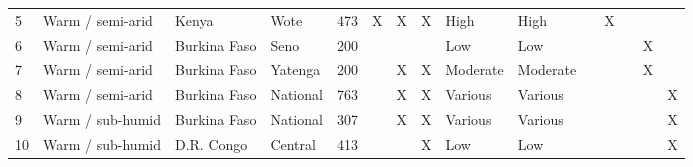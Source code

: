 \begin{sidewaystable}
\begin{tabular}{L{0.2cm} L{2.5cm} L{2cm} L{2cm} L{0.9cm} L{1cm} L{1cm} L{1cm} L{2cm} L{2cm} C{0.2cm} C{0.2cm} C{0.2cm} C{0.2cm} C{0.2cm}}
  5 & Warm / semi-arid & Kenya & Wote & 473 & X & X & X & High & High & & X & & & \\
  6 & Warm / semi-arid & Burkina Faso & Seno & 200 & &  & & Low & Low & & & & X & \\
  7 & Warm / semi-arid & Burkina Faso & Yatenga & 200 & & X & X & Moderate & Moderate & & & & X & \\
  8 & Warm / semi-arid & Burkina Faso & National & 763 & & X & X & Various & Various & & & & & X \\
  9 & Warm / sub-humid & Burkina Faso & National & 307 & & X & X & Various & Various & & & & & X \\
  10 & Warm / sub-humid & D.R. Congo & Central & 413 & & & X & Low & Low & & & & & X \\
  \bottomrule
  \end{tabular}

\end{sidewaystable}

